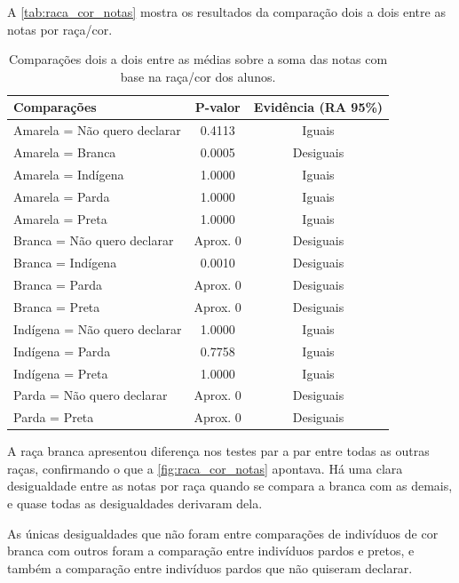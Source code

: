 \newpage
A \autoref{tab:raca_cor_notas} mostra os resultados da comparação dois a dois entre
as notas por raça/cor.
\begin{table}[htb]
    \centering
\caption{Comparações dois a dois entre as médias sobre a soma das notas
        com base na raça/cor dos alunos.\label{tab:raca_cor_notas}}
    \begin{tabular}{lcc}
    \toprule
    Comparações & P-valor & Evidência (RA 95\%)\\
    \midrule \midrule
    Amarela = Não quero declarar & 0.4113 & Iguais\\
    Amarela = Branca & 0.0005 & Desiguais\\
    Amarela = Indígena & 1.0000 & Iguais\\
    Amarela = Parda & 1.0000 & Iguais\\
    Amarela = Preta & 1.0000 & Iguais\\
    Branca = Não quero declarar & Aprox. 0 & Desiguais\\
    Branca = Indígena & 0.0010 & Desiguais\\
    Branca = Parda & Aprox. 0 & Desiguais\\
    Branca = Preta & Aprox. 0 & Desiguais\\
    Indígena = Não quero declarar & 1.0000 & Iguais\\
    Indígena = Parda & 0.7758 & Iguais\\
    Indígena = Preta & 1.0000  & Iguais\\
    Parda = Não quero declarar & Aprox. 0 & Desiguais\\
    Parda = Preta & Aprox. 0 & Desiguais\\
    \bottomrule
    \end{tabular}
    \centering
    
\end{table}

A raça branca apresentou diferença nos testes par a par entre todas as outras raças, confirmando
o que a \autoref{fig:raca_cor_notas} apontava. Há uma clara desigualdade entre as notas por raça
quando se compara a branca com as demais, e quase todas as desigualdades derivaram dela.

As únicas desigualdades que não foram entre comparações de indivíduos de cor branca com outros
foram a comparação entre indivíduos pardos e pretos, e também a comparação entre indivíduos pardos 
que não quiseram declarar.

